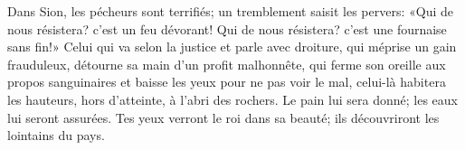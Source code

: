 Dans Sion, les pécheurs sont terrifiés; un tremblement saisit les pervers:
	«Qui de nous résistera? c’est un feu dévorant!
	Qui de nous résistera? c’est une fournaise sans fin!»
Celui qui va selon la justice et parle avec droiture,
	qui méprise un gain frauduleux, détourne sa main d’un profit malhonnête,
	qui ferme son oreille aux propos sanguinaires
	et baisse les yeux pour ne pas voir le mal,
	celui-là habitera les hauteurs, hors d’atteinte, à l’abri des rochers.
Le pain lui sera donné; les eaux lui seront assurées.
Tes yeux verront le roi dans sa beauté;
	ils découvriront les lointains du pays.
